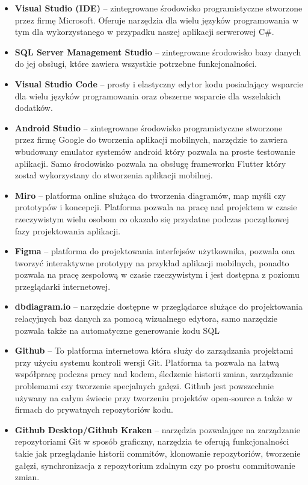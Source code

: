 \documentclass[a4paper,twoside,12pt]{book}
\begin{document}
\begin{itemize}
    \item \textbf{Visual Studio (IDE)} -- zintegrowane środowisko programistyczne stworzone przez firmę Microsoft. Oferuje narzędzia dla wielu języków programowania w tym dla wykorzystanego w przypadku naszej aplikacji serwerowej C\#.
    \item \textbf{SQL Server Management Studio} -- zintegrowane środowisko bazy danych do jej obsługi, które zawiera wszystkie potrzebne funkcjonalności. 
    \item \textbf{Visual Studio Code} -- prosty i elastyczny edytor kodu posiadający wsparcie dla wielu języków programowania oraz obszerne wsparcie dla wszelakich dodatków.
    \item \textbf{Android Studio} -- zintegrowane środowisko programistyczne stworzone przez firmę Google do tworzenia aplikacji mobilnych, narzędzie to zawiera wbudowany emulator systemów android który pozwala na proste testowanie aplikacji. Samo środowisko pozwala na obsługę frameworku Flutter który został wykorzystany do stworzenia aplikacji mobilnej.
    \item \textbf{Miro} -- platforma online służąca do tworzenia diagramów, map myśli czy prototypów i koncepcji. Platforma pozwala na pracę nad projektem w czasie rzeczywistym wielu osobom co okazało się przydatne podczas początkowej fazy projektowania aplikacji.
    \item \textbf{Figma} -- platforma do projektowania interfejsów użytkownika, pozwala ona tworzyć interaktywne prototypy na przykład aplikacji mobilnych, ponadto pozwala na pracę zespołową w czasie rzeczywistym i jest dostępna z poziomu przeglądarki internetowej.
    \item \textbf{dbdiagram.io} -- narzędzie dostępne w przeglądarce służące do projektowania relacyjnych baz danych za pomocą wizualnego edytora, samo narzędzie pozwala także na automatyczne generowanie kodu SQL
    \item \textbf{Github} -- To platforma internetowa która służy do zarządzania projektami przy użyciu systemu kontroli wersji Git. Platforma ta pozwala na łatwą współpracę podczas pracy nad kodem, śledzenie historii zmian, zarządzanie problemami czy tworzenie specjalnych gałęzi. Github jest powszechnie używany na całym świecie przy tworzeniu projektów open-source a także w firmach do prywatnych repozytoriów kodu.
    \item \textbf{Github Desktop/Github Kraken} -- narzędzia pozwalające na zarządzanie repozytoriami Git w sposób graficzny, narzędzia te oferują funkcjonalności takie jak przeglądanie historii commitów, klonowanie repozytoriów, tworzenie gałęzi, synchronizacja z repozytorium zdalnym czy po prostu commitowanie zmian.

\end{itemize}
\end{document}
